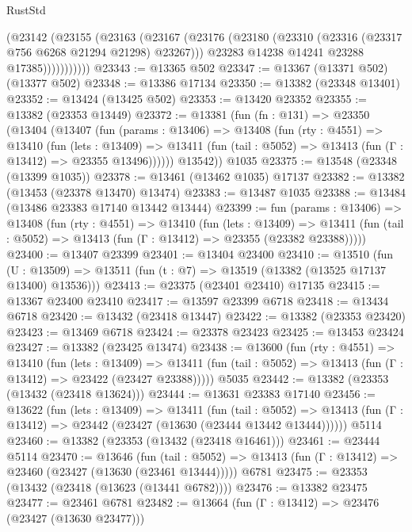 \begin{lexlean}{RustStd}
\begin{coremodule}
                (@23142
                  (@23155
                    (@23163
                      (@23167
                        (@23176
                          (@23180 (@23310 (@23316 (@23317 @756 @6268 @21294 @21298) @23267)))
                          @23283
                          @14238
                          @14241
                          @23288
                          @17385)))))))))))
@23343 := @13365 @502
@23347 := @13367 (@13371 @502) (@13377 @502)
@23348 := @13386 @17134
@23350 := @13382 (@23348 @13401)
@23352 := @13424 (@13425 @502)
@23353 := @13420 @23352
@23355 := @13382 (@23353 @13449)
@23372 := @13381
    (fun (fn : @131) =>
    @23350
      (@13404
        (@13407
          (fun (params : @13406) =>
          @13408
            (fun (rty : @4551) =>
            @13410
              (fun (lets : @13409) =>
              @13411 (fun (tail : @5052) => @13413 (fun (Γ : @13412) => @23355 @13496))))))
        @13542))
    @1035
@23375 := @13548 (@23348 (@13399 @1035))
@23378 := @13461 (@13462 @1035) @17137
@23382 := @13382 (@13453 (@23378 @13470) @13474)
@23383 := @13487 @1035
@23388 := @13484 (@13486 @23383 @17140 @13442 @13444)
@23399 := fun (params : @13406) =>
  @13408
    (fun (rty : @4551) =>
    @13410
      (fun (lets : @13409) =>
      @13411 (fun (tail : @5052) => @13413 (fun (Γ : @13412) => @23355 (@23382 @23388)))))
@23400 := @13407 @23399
@23401 := @13404 @23400
@23410 := @13510
    (fun (U : @13509) => @13511 (fun (t : @7) => @13519 (@13382 (@13525 @17137 @13400) @13536)))
@23413 := @23375 (@23401 @23410) @17135
@23415 := @13367 @23400 @23410
@23417 := @13597 @23399 @6718
@23418 := @13434 @6718
@23420 := @13432 (@23418 @13447)
@23422 := @13382 (@23353 @23420)
@23423 := @13469 @6718
@23424 := @23378 @23423
@23425 := @13453 @23424
@23427 := @13382 (@23425 @13474)
@23438 := @13600
    (fun (rty : @4551) =>
    @13410
      (fun (lets : @13409) =>
      @13411 (fun (tail : @5052) => @13413 (fun (Γ : @13412) => @23422 (@23427 @23388)))))
    @5035
@23442 := @13382 (@23353 (@13432 (@23418 @13624)))
@23444 := @13631 @23383 @17140
@23456 := @13622
    (fun (lets : @13409) =>
    @13411
      (fun (tail : @5052) =>
      @13413 (fun (Γ : @13412) => @23442 (@23427 (@13630 (@23444 @13442 @13444))))))
    @5114
@23460 := @13382 (@23353 (@13432 (@23418 @16461)))
@23461 := @23444 @5114
@23470 := @13646
    (fun (tail : @5052) => @13413 (fun (Γ : @13412) => @23460 (@23427 (@13630 (@23461 @13444)))))
    @6781
@23475 := @23353 (@13432 (@23418 (@13623 (@13441 @6782))))
@23476 := @13382 @23475
@23477 := @23461 @6781
@23482 := @13664 (fun (Γ : @13412) => @23476 (@23427 (@13630 @23477)))

\end{coremodule}
\end{lexlean}
